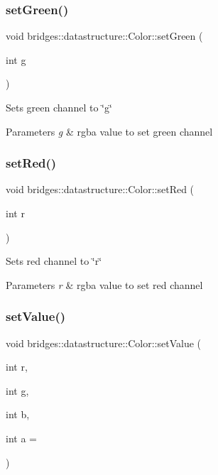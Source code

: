 \subsubsection{\texorpdfstring{setGreen()}{setGreen()}}
{\footnotesize\ttfamily void bridges\+::datastructure\+::\+Color\+::set\+Green (\begin{DoxyParamCaption}\item[{int}]{g }\end{DoxyParamCaption})\hspace{0.3cm}{\ttfamily [inline]}}

Sets green channel to \char`\"{}g\char`\"{} 
\begin{DoxyParams}{Parameters}
{\em g} & rgba value to set green channel \\
\hline
\end{DoxyParams}
\mbox{\label{classbridges_1_1datastructure_1_1_color_a487be07319fe83e9642cd0387ebed33a}} 
\subsubsection{\texorpdfstring{setRed()}{setRed()}}
{\footnotesize\ttfamily void bridges\+::datastructure\+::\+Color\+::set\+Red (\begin{DoxyParamCaption}\item[{int}]{r }\end{DoxyParamCaption})\hspace{0.3cm}{\ttfamily [inline]}}

Sets red channel to \char`\"{}r\char`\"{} 
\begin{DoxyParams}{Parameters}
{\em r} & rgba value to set red channel \\
\hline
\end{DoxyParams}
\mbox{\label{classbridges_1_1datastructure_1_1_color_aa23d4b981b994b4065f904195ffd8595}} 
\subsubsection{\texorpdfstring{setValue()}{setValue()}\hspace{0.1cm}{\footnotesize\ttfamily [1/2]}}
{\footnotesize\ttfamily void bridges\+::datastructure\+::\+Color\+::set\+Value (\begin{DoxyParamCaption}\item[{int}]{r,  }\item[{int}]{g,  }\item[{int}]{b,  }\item[{int}]{a = {} }\end{DoxyParamCaption})\hspace{0.3cm}{\ttfamily [inline]}}


